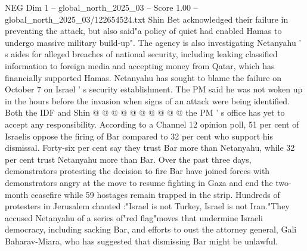 \begin{textsample}{NEG Dim 1 – global\_north\_2025\_03 – Score 1.00 – global\_north\_2025\_03/122654524.txt}
Shin Bet acknowledged their failure in preventing the attack, but also said"a policy of quiet had enabled Hamas to undergo massive military build-up".
The agency is also investigating Netanyahu ' s aides for alleged breaches of national security, including leaking classified information to foreign media and accepting money from Qatar, which has financially supported Hamas.
Netanyahu has sought to blame the failure on October 7 on Israel ' s security establishment.
The PM said he was not woken up in the hours before the invasion when signs of an attack were being identified.
Both the IDF and Shin @ @ @ @ @ @ @ @ @ @ the PM ' s office has yet to accept any responsibility.
According to a Channel 12 opinion poll, 51 per cent of Israelis oppose the firing of Bar compared to 32 per cent who support his dismissal.
Forty-six per cent say they trust Bar more than Netanyahu, while 32 per cent trust Netanyahu more than Bar.
Over the past three days, demonstrators protesting the decision to fire Bar have joined forces with demonstrators angry at the move to resume fighting in Gaza and end the two-month ceasefire while 59 hostages remain trapped in the strip.
Hundreds of protesters in Jerusalem chanted :"Israel is not Turkey, Israel is not Iran."They accused Netanyahu of a series of"red flag"moves that undermine Israeli democracy, including sacking Bar, and efforts to oust the attorney general, Gali Baharav-Miara, who has suggested that dismissing Bar might be unlawful.

\end{textsample}
